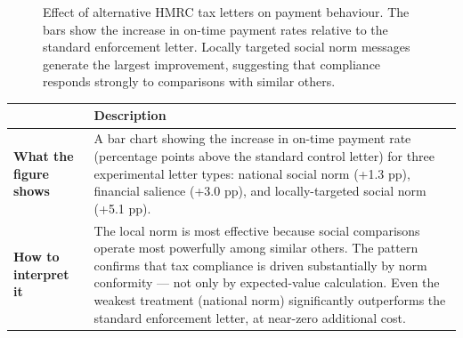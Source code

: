 \documentclass[12pt, letterpaper]{article}
\begin{document}
\begin{figure}[H]
\centering


\caption{
Effect of alternative HMRC tax letters on payment behaviour. 
The bars show the increase in on-time payment rates relative to the standard enforcement letter. 
Locally targeted social norm messages generate the largest improvement, suggesting that compliance responds strongly to comparisons with similar others.
}
\label{fig:tax_social_norms}

\end{figure}

\begin{table}[H]
\centering
\small
\begin{tabularx}{\linewidth}{lY}
\toprule
 & Description \\
\midrule
\textbf{What the figure shows} & A bar chart showing the increase in on-time payment rate (percentage points above the standard control letter) for three experimental letter types: national social norm (+1.3 pp), financial salience (+3.0 pp), and locally-targeted social norm (+5.1 pp). \\
\textbf{How to interpret it} & The local norm is most effective because social comparisons operate most powerfully among similar others. The pattern confirms that tax compliance is driven substantially by norm conformity --- not only by expected-value calculation. Even the weakest treatment (national norm) significantly outperforms the standard enforcement letter, at near-zero additional cost. \\
\bottomrule
\end{tabularx}
\end{table}
\end{document}
